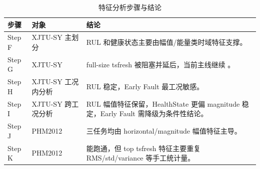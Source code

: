 \begin{table}[htbp]
\centering
\caption{特征分析步骤与结论}
\label{tab:analysis_runs}
\small
\begin{tabularx}{\textwidth}{llY}
\toprule
步骤 & 对象 & 结论 \\
\midrule
Step F & XJTU-SY  主划分 & RUL 和健康状态主要由幅值/能量类时域特征支撑。\\
Step G & XJTU-SY  & full-size tsfresh 被阻塞并延后，当前主线继续 。\\
Step H & XJTU-SY 工况内分析 & RUL 稳定，Early Fault 最工况敏感。\\
Step I & XJTU-SY 跨工况分析 & RUL 幅值特征保留，HealthState 更偏 magnitude 稳定，Early Fault 需降级为条件性结论。\\
Step J & PHM2012  & 三任务均由 horizontal/magnitude 幅值特征主导。\\
Step K & PHM2012  & 能跑通，但 top tsfresh 特征主要重复 RMS/std/variance 等手工统计量。\\
\bottomrule
\end{tabularx}
\end{table}
